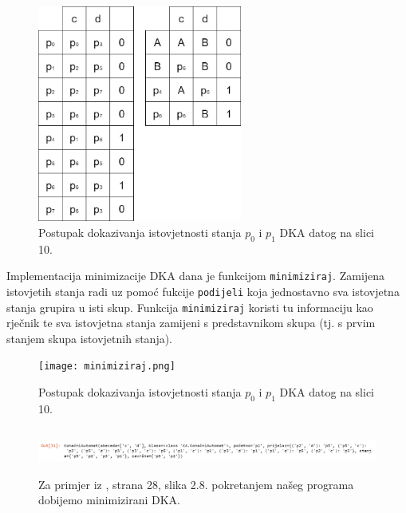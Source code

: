 \documentclass[titlepage]{article}
\begin{document}
\begin{figure}[h]
\centering
\includegraphics[width=0.6\textwidth]{2_10.jpg}
\caption{Postupak dokazivanja istovjetnosti stanja $p_0$ i $p_1$ DKA datog na slici 10.}
\end{figure}
Implementacija minimizacije DKA dana je funkcijom \texttt{minimiziraj}. Zamijena istovjetih stanja radi uz pomoć fukcije \texttt{podijeli} koja jednostavno sva istovjetna stanja grupira u isti skup. Funkcija \texttt{minimiziraj} koristi tu informaciju kao rječnik te sva istovjetna stanja zamijeni s predstavnikom skupa (tj. s prvim stanjem skupa istovjetnih stanja).  
\begin{figure}[h]
\centering
\texttt{[image: minimiziraj.png]}
\caption{Postupak dokazivanja istovjetnosti stanja $p_0$ i $p_1$ DKA datog na slici 10.}
\end{figure}
\begin{figure}[h]
\centering
\includegraphics[width=\textwidth, height = 1.5cm]{izrezak.png}
\caption{Za primjer iz \cite{c1}, strana 28, slika 2.8. pokretanjem našeg programa dobijemo minimizirani DKA.}
\end{figure}
\newpage
\end{document}
